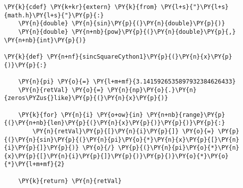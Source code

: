 \begin{Verbatim}[commandchars=\\\{\}]
\PY{k}{cdef} \PY{k+kr}{extern} \PY{k}{from} \PY{l+s}{"}\PY{l+s}{math.h}\PY{l+s}{"}\PY{p}{:}
    \PY{n}{double} \PY{n}{sin}\PY{p}{(}\PY{n}{double}\PY{p}{)}
    \PY{n}{double} \PY{n+nb}{pow}\PY{p}{(}\PY{n}{double}\PY{p}{,} \PY{n+nb}{int}\PY{p}{)}

\PY{k}{def} \PY{n+nf}{sincSquareCython1}\PY{p}{(}\PY{n}{x}\PY{p}{)}\PY{p}{:}

    \PY{n}{pi} \PY{o}{=} \PY{l+m+mf}{3.1415926535897932384626433}
    \PY{n}{retVal} \PY{o}{=} \PY{n}{np}\PY{o}{.}\PY{n}{zeros\PYZus{}like}\PY{p}{(}\PY{n}{x}\PY{p}{)}

    \PY{k}{for} \PY{n}{i} \PY{o+ow}{in} \PY{n+nb}{range}\PY{p}{(}\PY{n+nb}{len}\PY{p}{(}\PY{n}{x}\PY{p}{)}\PY{p}{)}\PY{p}{:}
        \PY{n}{retVal}\PY{p}{[}\PY{n}{i}\PY{p}{]} \PY{o}{=} \PY{p}{(}\PY{n}{sin}\PY{p}{(}\PY{n}{pi}\PY{o}{*}\PY{n}{x}\PY{p}{[}\PY{n}{i}\PY{p}{]}\PY{p}{)} \PY{o}{/} \PY{p}{(}\PY{n}{pi}\PY{o}{*}\PY{n}{x}\PY{p}{[}\PY{n}{i}\PY{p}{]}\PY{p}{)}\PY{p}{)}\PY{o}{*}\PY{o}{*}\PY{l+m+mf}{2}

    \PY{k}{return} \PY{n}{retVal}
\end{Verbatim}
